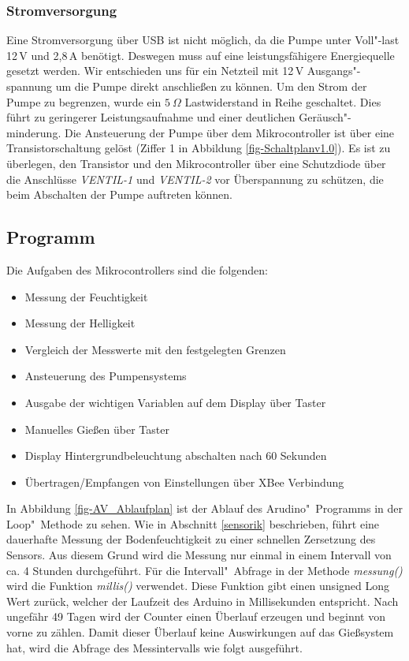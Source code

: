 	
\subsubsection{Stromversorgung}

Eine Stromversorgung über USB ist nicht möglich, da die Pumpe unter Voll"-last 12\,V und 2,8\,A benötigt. 
Deswegen muss auf eine leistungsfähigere Energiequelle gesetzt werden.
Wir entschieden uns für ein Netzteil mit 12\,V Ausgangs"-spannung um die Pumpe direkt anschließen zu können. 
Um den Strom der Pumpe zu begrenzen, wurde ein \begin{math}5~\Omega\end{math} Lastwiderstand in Reihe geschaltet.
Dies führt zu geringerer Leistungsaufnahme und einer deutlichen Geräusch"-minderung.
Die Ansteuerung der Pumpe über dem Mikrocontroller ist über eine Transistorschaltung gelöst (Ziffer 1 in Abbildung \ref{fig-Schaltplanv1.0}).
Es ist zu überlegen, den Transistor und den Mikrocontroller über eine Schutzdiode über die Anschlüsse \emph{VENTIL-1} und \emph{VENTIL-2} vor Überspannung zu schützen, die beim Abschalten der Pumpe auftreten können. 
 

\subsection{Programm}
	

	Die Aufgaben des Mikrocontrollers sind die folgenden:
		\begin{itemize}
			\item Messung der Feuchtigkeit
			\item Messung der Helligkeit
			\item Vergleich der Messwerte mit den festgelegten Grenzen
			\item Ansteuerung des Pumpensystems
			\item Ausgabe der wichtigen Variablen auf dem Display über Taster
			\item Manuelles Gießen über Taster
			\item Display Hintergrundbeleuchtung abschalten nach 60 Sekunden
			\item Übertragen/Empfangen von Einstellungen über XBee Verbindung
		\end{itemize}
		
	

	
In Abbildung \ref{fig-AV_Ablaufplan} ist der Ablauf des Arudino"~Programms in der Loop"~Methode zu sehen.
Wie in Abschnitt \ref{sensorik} beschrieben, führt eine dauerhafte Messung der Bodenfeuchtigkeit zu einer schnellen Zersetzung des Sensors.
Aus diesem Grund wird die Messung nur einmal in einem Intervall von ca. 4 Stunden durchgeführt. Für die Intervall"~Abfrage in der Methode \emph{messung()} wird die Funktion \emph{millis()} verwendet. Diese Funktion gibt einen unsigned Long Wert zurück, welcher der Laufzeit des Arduino in Millisekunden entspricht. Nach ungefähr 49 Tagen wird der Counter einen Überlauf erzeugen und beginnt von vorne zu zählen. Damit dieser Überlauf keine Auswirkungen auf das Gießsystem hat, wird die Abfrage des Messintervalls wie folgt ausgeführt.

